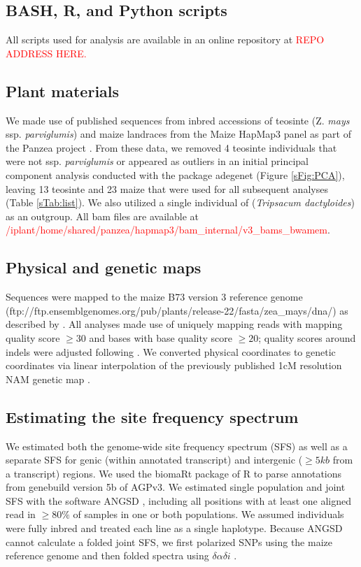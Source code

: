 \documentclass{pnastwo}
\begin{document}
\begin{article}
\begin{materials}
\subsection{BASH, R, and Python scripts}
All scripts used for analysis are available in an online repository at \textcolor{red}{REPO ADDRESS HERE.} 

\subsection{Plant materials}
We made use of published sequences from inbred accessions of teosinte (Z. {\it mays} ssp. {\it parviglumis}) and maize landraces from the Maize HapMap3 panel as part of the Panzea project  \cite{chia2012, lemmon2014, bukowski2015}. 
From these data, we removed 4 teosinte individuals that were not ssp. \textit{parviglumis} or appeared as outliers in an initial principal component analysis conducted with the package adegenet \cite{jombart2011} (Figure \ref{sFig:PCA}), leaving 13 teosinte and 23 maize that were used for all subsequent analyses (Table \ref{sTab:list}). We also utilized a single individual of (\textit{Tripsacum dactyloides}) as an outgroup.  All bam files are available at \textcolor{red}{/iplant/home/shared/panzea/hapmap3/bam\_internal/v3\_bams\_bwamem}. 

\subsection{Physical and genetic maps}
Sequences were mapped to the maize B73 version 3 reference genome \cite{schnable2009} (ftp://ftp.ensemblgenomes.org/pub/plants/release-22/fasta/zea\_mays/dna/) as described by \cite{bukowski2015}. 
All analyses made use of uniquely mapping reads with mapping quality score $\geq  30$ and bases with base quality score $\geq 20$; quality scores around indels were adjusted following \cite{li2011statistical}.
We converted physical coordinates to genetic coordinates via linear interpolation of the previously published 1cM resolution NAM genetic map \cite{glaubitz2014}. 

\subsection{Estimating the site frequency spectrum}
We estimated both the genome-wide site frequency spectrum (SFS) as well as a separate SFS for genic (within annotated transcript) and intergenic ($\geq 5kb$ from a transcript) regions. 
We used the biomaRt package \cite{durinck2009,durinck2005} of R \cite{R2014} to parse annotations from genebuild version 5b of AGPv3. 
We estimated single population and joint SFS with the software ANGSD \cite{korneliussen2014}, including all positions with at least one aligned read in $\geq 80\%$ of samples in one or both populations.
We assumed individuals were fully inbred and treated each line as a single haplotype. Because ANGSD cannot calculate a folded joint SFS, we first polarized SNPs using the maize reference genome and then folded spectra using $\delta\alpha\delta{i}$ \cite{gutenkunst2009}.


\end{materials}
\end{article}
\end{document}
